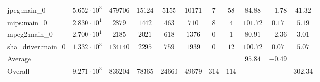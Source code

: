 \begin{tabular}{|l|c|c|c|c|c|c|c|c|c|c|}
jpeg:main\_0            & $ 5.652 \cdot 10^{3} $ & $ 479706 $ & $ 15124 $ & $ 5155  $ & $ 10171 $ & $ 7   $ & $ 58  $ & $ 84.88       $ & $ -1.78   $ & $ 41.32   $ \\
mips:main\_0            & $ 2.830 \cdot 10^{1} $ & $ 2879   $ & $ 1442  $ & $ 463   $ & $ 710   $ & $ 8   $ & $ 4   $ & $ 101.72      $ & $ 0.17    $ & $ 5.19    $ \\
mpeg2:main\_0           & $ 2.700 \cdot 10^{1} $ & $ 2185   $ & $ 2021  $ & $ 618   $ & $ 1376  $ & $ 0   $ & $ 1   $ & $ 80.91       $ & $ -2.36   $ & $ 3.01    $ \\
sha\_driver:main\_0     & $ 1.332 \cdot 10^{3} $ & $ 134140 $ & $ 2295  $ & $ 759   $ & $ 1939  $ & $ 0   $ & $ 12  $ & $ 100.72      $ & $ 0.07    $ & $ 5.07    $ \\
\hline
Average                 & $                    $ & $        $ & $       $ & $       $ & $       $ & $     $ & $     $ & $ 95.84       $ & $ -0.49   $ & $         $ \\
\hline
Overall                 & $ 9.271 \cdot 10^{3} $ & $ 836204 $ & $ 78365 $ & $ 24660 $ & $ 49679 $ & $ 314 $ & $ 114 $ & $             $ & $         $ & $ 302.34  $ \\
\hline
\end{tabular}
